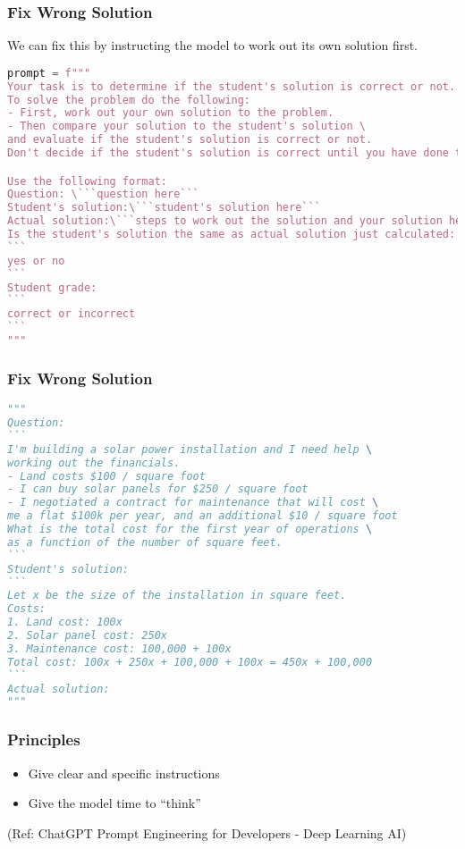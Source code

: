 \begin{frame}[fragile]\frametitle{Fix Wrong Solution}

We can fix this by instructing the model to work out its own solution first.

{\tiny
\begin{lstlisting}[language=Python]
prompt = f"""
Your task is to determine if the student's solution is correct or not.
To solve the problem do the following:
- First, work out your own solution to the problem. 
- Then compare your solution to the student's solution \ 
and evaluate if the student's solution is correct or not. 
Don't decide if the student's solution is correct until you have done the problem yourself.

Use the following format:
Question: \```question here```
Student's solution:\```student's solution here```
Actual solution:\```steps to work out the solution and your solution here```
Is the student's solution the same as actual solution just calculated:
```
yes or no
```
Student grade:
```
correct or incorrect
```
"""
\end{lstlisting}
}
\end{frame}


\begin{frame}[fragile]\frametitle{Fix Wrong Solution}


{\tiny
\begin{lstlisting}[language=Python]
"""
Question:
```
I'm building a solar power installation and I need help \
working out the financials. 
- Land costs $100 / square foot
- I can buy solar panels for $250 / square foot
- I negotiated a contract for maintenance that will cost \
me a flat $100k per year, and an additional $10 / square foot
What is the total cost for the first year of operations \
as a function of the number of square feet.
``` 
Student's solution:
```
Let x be the size of the installation in square feet.
Costs:
1. Land cost: 100x
2. Solar panel cost: 250x
3. Maintenance cost: 100,000 + 100x
Total cost: 100x + 250x + 100,000 + 100x = 450x + 100,000
```
Actual solution:
"""
\end{lstlisting}
}
\end{frame}


\begin{frame}[fragile]\frametitle{Principles}

\begin{itemize}
\item Give clear and specific instructions
\item Give the model time to “think”
\end{itemize}
		
{\tiny (Ref: ChatGPT Prompt Engineering for Developers - Deep Learning AI)}
		
\end{frame}


